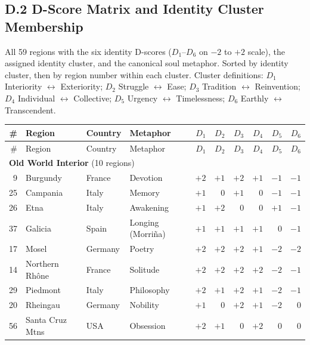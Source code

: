 \documentclass[11pt]{article}
\begin{document}
\begin{landscape}
\section*{D.2 D-Score Matrix and Identity Cluster Membership}
All 59 regions with the six identity D-scores ($D_1$--$D_6$ on $-2$ to $+2$ scale), the assigned identity cluster, and the canonical soul metaphor. Sorted by identity cluster, then by region number within each cluster. Cluster definitions: $D_1$ Interiority $\leftrightarrow$ Exteriority; $D_2$ Struggle $\leftrightarrow$ Ease; $D_3$ Tradition $\leftrightarrow$ Reinvention; $D_4$ Individual $\leftrightarrow$ Collective; $D_5$ Urgency $\leftrightarrow$ Timelessness; $D_6$ Earthly $\leftrightarrow$ Transcendent.

\renewcommand{\arraystretch}{1.05}
\small
\begin{longtable}{@{}r l l l r r r r r r@{}}
\toprule
\# & Region & Country & Metaphor & $D_1$ & $D_2$ & $D_3$ & $D_4$ & $D_5$ & $D_6$ \\
\midrule
\endfirsthead
\toprule
\# & Region & Country & Metaphor & $D_1$ & $D_2$ & $D_3$ & $D_4$ & $D_5$ & $D_6$ \\
\midrule
\endhead
\multicolumn{10}{l}{\textbf{Old World Interior} (10 regions)} \\
9  & Burgundy             & France   & Devotion              & $+2$ & $+1$ & $+2$ & $+1$ & $-1$ & $-1$ \\
25 & Campania             & Italy    & Memory                & $+1$ & $0$  & $+1$ & $0$  & $-1$ & $-1$ \\
26 & Etna                 & Italy    & Awakening             & $+1$ & $+2$ & $0$  & $0$  & $+1$ & $-1$ \\
37 & Galicia              & Spain    & Longing (Morri\~na)   & $+1$ & $+1$ & $+1$ & $+1$ & $0$  & $-1$ \\
17 & Mosel                & Germany  & Poetry                & $+2$ & $+2$ & $+2$ & $+1$ & $-2$ & $-2$ \\
14 & Northern Rh\^one     & France   & Solitude              & $+2$ & $+2$ & $+2$ & $+2$ & $-2$ & $-1$ \\
29 & Piedmont             & Italy    & Philosophy            & $+2$ & $+1$ & $+2$ & $+1$ & $-2$ & $-1$ \\
20 & Rheingau             & Germany  & Nobility              & $+1$ & $0$  & $+2$ & $+1$ & $-2$ & $0$  \\
56 & Santa Cruz Mtns      & USA      & Obsession             & $+2$ & $+1$ & $0$  & $+2$ & $0$  & $0$  \\

\end{longtable}
\end{landscape}
\end{document}
